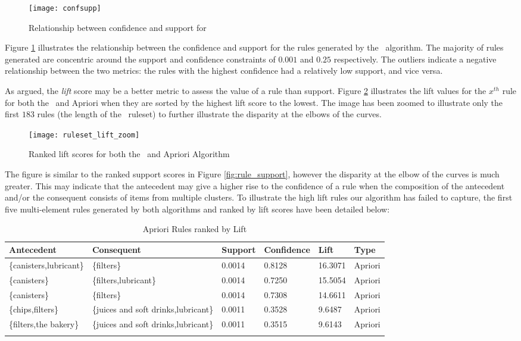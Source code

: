 \begin{figure}[H]
\centering
\texttt{[image: confsupp]}
\caption{Relationship between confidence and support for \algo}
\label{fig:confsupp}
\end{figure}
Figure \ref{fig:confsupp} illustrates the relationship between the confidence and support for the rules generated by the \algo\ algorithm.
The majority of rules generated are concentric around the support and confidence constraints of $0.001$ and $0.25$ respectively. The outliers indicate a negative relationship between the two metrics: the rules with the highest confidence had a relatively low support, and vice versa.

As  argued, the \textit{lift} score may be a better metric to assess the value of a rule than support. Figure \ref{fig:rule_lift} illustrates the lift values for the $x^{th}$ rule for both the \algo\ and Apriori when they are sorted by the highest lift score to the lowest. The image has been zoomed to illustrate only the first $183$ rules (the length of the \algo\ ruleset) to further illustrate the disparity at the elbows of the curves.
\begin{figure}[H]
\centering
\texttt{[image: ruleset\_lift\_zoom]}
\caption{Ranked lift scores for both the \algo\ and Apriori Algorithm}
\label{fig:rule_lift}
\end{figure}
The figure is similar to the ranked support scores in Figure \ref{fig:rule_support}, however the disparity at the elbow of the curves is much greater. This may indicate that the antecedent may give a higher rise to the confidence of a rule when the composition of the antecedent and/or the consequent consists of items from multiple clusters. To illustrate the high lift rules our algorithm has failed to capture, the first five multi-element rules generated by both algorithms and ranked by lift scores have been detailed below:

\begin{longtable}
{@{}llllll@{}}\toprule Antecedent& Consequent& Support& Confidence& Lift& Type\\*\midrule\endfirsthead\endhead
\{canisters,lubricant\} & \{filters\} & 0.0014 & 0.8128 & 16.3071 & Apriori\\
\{canisters\} & \{filters,lubricant\} & 0.0014 & 0.7250 & 15.5054 & Apriori\\
\{canisters\} & \{filters\} & 0.0014 & 0.7308 & 14.6611 & Apriori\\
\{chips,filters\} & \{juices and soft drinks,lubricant\} & 0.0011 & 0.3528 & 9.6487 & Apriori\\
\{filters,the bakery\} & \{juices and soft drinks,lubricant\} & 0.0011 & 0.3515 & 9.6143 & Apriori\\
\midrule\caption{Apriori Rules ranked by Lift}\label{tab:apri_lift}\end{longtable}


